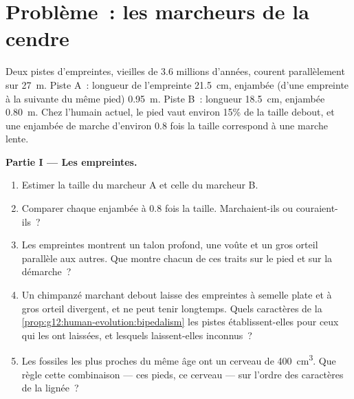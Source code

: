 \section{Problème~: les marcheurs de la cendre}

\begin{problem}
\label{pb:g12:human-evolution:1}
Deux pistes d'empreintes, vieilles de 3.6 millions d'années, courent
parallèlement sur \qty{27}{m}. Piste A~: longueur de l'empreinte
\qty{21.5}{cm}, enjambée (d'une empreinte à la suivante du même pied)
\qty{0.95}{m}. Piste B~: longueur \qty{18.5}{cm}, enjambée
\qty{0.80}{m}. Chez l'humain actuel, le pied vaut environ 15\% de la
taille debout, et une enjambée de marche d'environ 0.8 fois la taille
correspond à une marche lente.

\medskip
\noindent\textbf{Partie I --- Les empreintes.}
\begin{enumerate}
  \item Estimer la taille du marcheur A et celle du marcheur B.
  \item Comparer chaque enjambée à 0.8 fois la taille. Marchaient-ils
        ou couraient-ils~?
  \item Les empreintes montrent un talon profond, une voûte et un gros
        orteil parallèle aux autres. Que montre chacun de ces traits
        sur le pied et sur la démarche~?
  \item Un chimpanzé marchant debout laisse des empreintes à semelle
        plate et à gros orteil divergent, et ne peut tenir longtemps.
        Quels caractères de la
        \cref{prop:g12:human-evolution:bipedalism} les pistes
        établissent-elles pour ceux qui les ont laissées, et lesquels
        laissent-elles inconnus~?
  \item Les fossiles les plus proches du même âge ont un cerveau de
        \qty{400}{cm^3}. Que règle cette combinaison --- ces pieds, ce
        cerveau --- sur l'ordre des caractères de la lignée~?
\end{enumerate}


\end{problem}
